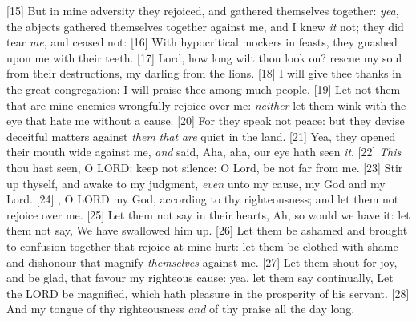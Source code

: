 [15] \textcolor[cmyk]{0.99998,1,0,0}{But in mine adversity they rejoiced, and gathered themselves together: \emph{yea}, the abjects gathered themselves together against me, and I knew \emph{it} not; they did tear \emph{me}, and ceased not:}
[16] \textcolor[cmyk]{0.99998,1,0,0}{With hypocritical mockers in feasts, they gnashed upon me with their teeth.}
[17] \textcolor[cmyk]{0.99998,1,0,0}{Lord, how long wilt thou look on? rescue my soul from their destructions, my darling from the lions.}
[18] \textcolor[cmyk]{0.99998,1,0,0}{I will give thee thanks in the great congregation: I will praise thee among much people.}
[19] \textcolor[cmyk]{0.99998,1,0,0}{Let not them that are mine enemies wrongfully rejoice over me: \emph{neither} let them wink with the eye that hate me without a cause.}
[20] \textcolor[cmyk]{0.99998,1,0,0}{For they speak not peace: but they devise deceitful matters against \emph{them} \emph{that} \emph{are} quiet in the land.}
[21] \textcolor[cmyk]{0.99998,1,0,0}{Yea, they opened their mouth wide against me, \emph{and} said, Aha, aha, our eye hath seen \emph{it}.}
[22] \textcolor[cmyk]{0.99998,1,0,0}{\emph{This} thou hast seen, O LORD: keep not silence: O Lord, be not far from me.}
[23] \textcolor[cmyk]{0.99998,1,0,0}{Stir up thyself, and awake to my judgment, \emph{even} unto my cause, my God and my Lord.}
[24] \textcolor[cmyk]{0.99998,1,0,0}{, O LORD my God, according to thy righteousness; and let them not rejoice over me.}
[25] \textcolor[cmyk]{0.99998,1,0,0}{Let them not say in their hearts, Ah, so would we have it: let them not say, We have swallowed him up.}
[26] \textcolor[cmyk]{0.99998,1,0,0}{Let them be ashamed and brought to confusion together that rejoice at mine hurt: let them be clothed with shame and dishonour that magnify \emph{themselves} against me.}
[27] \textcolor[cmyk]{0.99998,1,0,0}{Let them shout for joy, and be glad, that favour my righteous cause: yea, let them say continually, Let the LORD be magnified, which hath pleasure in the prosperity of his servant.}
[28] \textcolor[cmyk]{0.99998,1,0,0}{And my tongue  of thy righteousness \emph{and} of thy praise all the day long.}


